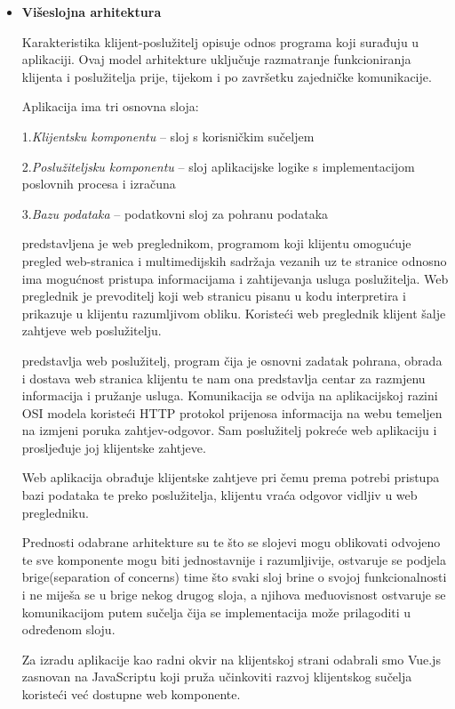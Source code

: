 \begin{itemize}
		\item  \textbf{Višeslojna arhitektura}

Karakteristika klijent-poslužitelj opisuje odnos programa koji surađuju u aplikaciji. Ovaj model arhitekture uključuje razmatranje funkcioniranja klijenta i poslužitelja prije, tijekom i po završetku zajedničke komunikacije.


Aplikacija ima tri osnovna sloja:

1.\textit{Klijentsku komponentu} – sloj s korisničkim sučeljem

2.\textit{Poslužiteljsku komponentu} – sloj aplikacijske logike s implementacijom poslovnih procesa i izračuna

3.\textit{Bazu podataka} – podatkovni sloj za pohranu podataka


 predstavljena je web preglednikom, programom koji klijentu omogućuje pregled web-stranica i multimedijskih sadržaja vezanih uz te stranice odnosno ima mogućnost pristupa informacijama i zahtijevanja usluga poslužitelja. Web preglednik je prevoditelj koji web stranicu pisanu u kodu interpretira i prikazuje u klijentu razumljivom obliku. Koristeći web preglednik klijent šalje zahtjeve web poslužitelju.

 predstavlja web poslužitelj, program čija je osnovni zadatak pohrana, obrada i dostava web stranica klijentu te nam ona predstavlja centar za razmjenu informacija i pružanje usluga. Komunikacija se odvija na aplikacijskoj razini OSI modela koristeći HTTP protokol prijenosa informacija na webu temeljen na izmjeni poruka zahtjev-odgovor. Sam poslužitelj pokreće web aplikaciju i prosljeđuje joj klijentske zahtjeve. 

Web aplikacija obrađuje klijentske zahtjeve pri čemu prema potrebi pristupa bazi podataka te preko poslužitelja, klijentu vraća odgovor vidljiv u web pregledniku.

Prednosti odabrane arhitekture su te što se slojevi mogu oblikovati odvojeno te sve komponente mogu biti jednostavnije i razumljivije, ostvaruje se podjela brige(separation of concerns) time što svaki sloj brine o svojoj funkcionalnosti i ne miješa se u brige nekog drugog sloja, a njihova međuovisnost ostvaruje se komunikacijom putem sučelja čija se implementacija može prilagoditi u određenom sloju.

Za izradu aplikacije kao radni okvir na klijentskoj strani odabrali smo Vue.js zasnovan na JavaScriptu koji pruža učinkoviti razvoj klijentskog sučelja koristeći već dostupne web komponente. 


\end{itemize}
